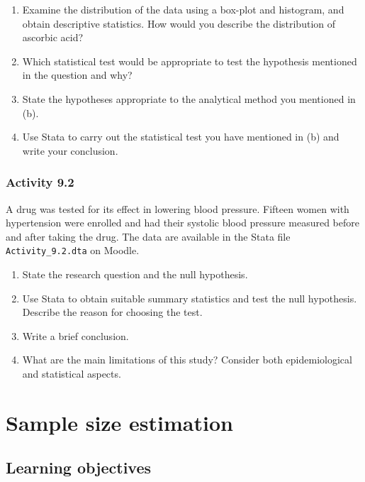\documentclass[
]{memoir}
\providecommand{\tightlist}{%
  \setlength{\itemsep}{0pt}\setlength{\parskip}{0pt}}
\begin{document}
\begin{enumerate}
\def\labelenumi{\alph{enumi})}
\tightlist
\item
  Examine the distribution of the data using a box-plot and histogram, and obtain descriptive statistics. How would you describe the distribution of ascorbic acid?
\item
  Which statistical test would be appropriate to test the hypothesis mentioned in the question and why?
\item
  State the hypotheses appropriate to the analytical method you mentioned in (b).
\item
  Use Stata to carry out the statistical test you have mentioned in (b) and write your conclusion.
\end{enumerate}

\hypertarget{activity-9.2}{%
\subsection*{Activity 9.2}\label{activity-9.2}}

A drug was tested for its effect in lowering blood pressure. Fifteen women with hypertension were enrolled and had their systolic blood pressure measured before and after taking the drug. The data are available in the Stata file \texttt{Activity\_9.2.dta} on Moodle.

\begin{enumerate}
\def\labelenumi{\alph{enumi})}
\tightlist
\item
  State the research question and the null hypothesis.
\item
  Use Stata to obtain suitable summary statistics and test the null hypothesis. Describe the reason for choosing the test.
\item
  Write a brief conclusion.
\item
  What are the main limitations of this study? Consider both epidemiological and statistical aspects.
\end{enumerate}

\hypertarget{sample-size-estimation}{%
\chapter{Sample size estimation}\label{sample-size-estimation}}

\hypertarget{learning-objectives-9}{%
\section*{Learning objectives}\label{learning-objectives-9}}
\end{document}
